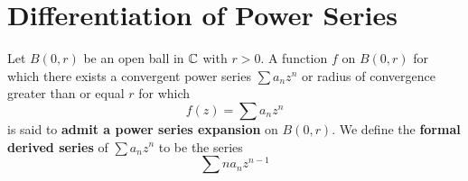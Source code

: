 \section{Differentiation of Power Series}

\begin{definition}
    Let $B(0,r)$ be an open ball in $\mathbb{C}$ with  $r>0$. A function $f$ on $B(0,r)$
    for which there exists a convergent power series $\sum{a_nz^n}$ or radius of
    convergence greater than or equal $r$ for which
    \begin{equation*}
        f(z)=\sum{a_nz^n}
    \end{equation*}
    is said to \textbf{admit a power series expansion} on $B(0,r)$. We define
    the \textbf{formal derived series} of $\sum{a_nz^n}$ to be the series
    \begin{equation*}
        \sum{na_nz^{n-1}}
    \end{equation*}
\end{definition}

